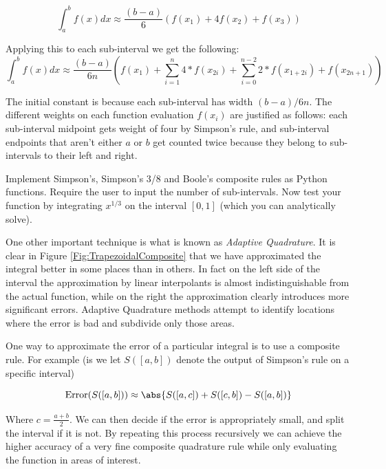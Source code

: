 \[
\int_a^b f(x) dx \approx \frac{(b-a)}{6}\left(f(x_1) + 4 f(x_2) + f(x_3)\right)
\]

Applying this to each sub-interval we get the following:
\[
\int_a^b f(x) dx \approx \frac{(b-a)}{6n}\left( f(x_1) + \sum_{i=1}^{n} 4*f(x_{2i}) + \sum_{i=0}^{n-2} 2*f(x_{1+2i}) + f(x_{2n+1})\right)
\]

The initial constant is because each sub-interval has width $(b-a)/6n$.
The different weights on each function evaluation $f(x_i)$ are justified as follows: each sub-interval midpoint gets weight of four by Simpson's rule, and sub-interval endpoints that aren't either $a$ or $b$ get counted twice because they belong to sub-intervals to their left and right.

\begin{problem}
Implement Simpson's, Simpson's 3/8 and Boole's composite rules as Python functions.
Require the user to input the number of sub-intervals.
Now test your function by integrating $x^{1/3}$ on the interval $[0,1]$ (which you can analytically solve).
\end{problem}

One other important technique is what is known as \emph{Adaptive Quadrature}.
It is clear in Figure \ref{Fig:TrapezoidalComposite} that we have approximated the integral better in some places than in others.
In fact on the left side of the interval the approximation by linear interpolants is almost indistinguishable from the actual function, while on the right the approximation clearly introduces more significant errors.
Adaptive Quadrature methods attempt to identify locations where the error is bad and subdivide only those areas.

One way to approximate the error of a particular integral is to use a composite rule.
For example (is we let $S([a,b])$ denote the output of Simpson's rule on a specific interval)

\[
\mbox{Error}(S([a,b])) \approx \abs{S([a,c]) + S([c,b]) - S([a,b])}
\]

Where $c = \frac{a+b}{2}$.
We can then decide if the error is appropriately small, and split the interval if it is not.
By repeating this process recursively we can achieve the higher accuracy of a very fine composite quadrature rule while only evaluating the function in areas of interest.

